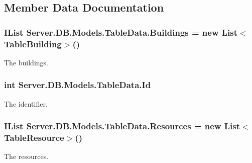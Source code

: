 \subsection{Member Data Documentation}
\hypertarget{classServer_1_1DB_1_1Models_1_1TableData_a843ace663a9074a04e14d35ac93c19b3}{}
\subsubsection[{Buildings}]{\setlength{\rightskip}{0pt plus 5cm}I\+List Server.\+D\+B.\+Models.\+Table\+Data.\+Buildings = new List$<${\bf Table\+Building}$>$()}\label{classServer_1_1DB_1_1Models_1_1TableData_a843ace663a9074a04e14d35ac93c19b3}


The buildings. 

\hypertarget{classServer_1_1DB_1_1Models_1_1TableData_a61d88561b8476093477f356616571c5a}{}
\subsubsection[{Id}]{\setlength{\rightskip}{0pt plus 5cm}int Server.\+D\+B.\+Models.\+Table\+Data.\+Id}\label{classServer_1_1DB_1_1Models_1_1TableData_a61d88561b8476093477f356616571c5a}


The identifier. 

\hypertarget{classServer_1_1DB_1_1Models_1_1TableData_ad37f859f89ae46c48eb18469f22ba57d}{}
\subsubsection[{Resources}]{\setlength{\rightskip}{0pt plus 5cm}I\+List Server.\+D\+B.\+Models.\+Table\+Data.\+Resources = new List$<${\bf Table\+Resource}$>$()}\label{classServer_1_1DB_1_1Models_1_1TableData_ad37f859f89ae46c48eb18469f22ba57d}


The resources. 

